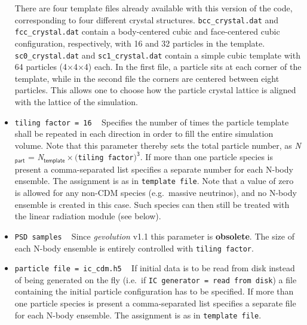 \documentclass[a4paper,10pt]{article}
\begin{document}
\begin{itemize}
 There are four template files already available with this version of the code, corresponding to four different crystal structures.
 \texttt{bcc\_crystal.dat} and \texttt{fcc\_crystal.dat} contain a body-centered cubic and face-centered cubic configuration, respectively,
 with 16 and 32 particles in the template. \texttt{sc0\_crystal.dat} and \texttt{sc1\_crystal.dat} contain a simple cubic template with 64
 particles (4$\times$4$\times$4) each. In the first file, a particle sits at each corner of the template, while in the second file the
 corners are centered between eight particles. This allows one to choose how the particle crystal lattice is aligned with the lattice of the
 simulation.
 \item[] \hspace{-25pt}\texttt{tiling factor = 16} ~ Specifies the number of times the particle template shall be repeated in each direction
 in order to fill the entire simulation volume. Note that this parameter thereby sets the total particle number, as
 \textit{N}$_\mathsf{part}$ = \textit{N}$_\mathsf{template} \times ($\texttt{tiling factor}$)^\mathsf{3}$. If more than one particle species
 is present a comma-separated list specifies a separate number for each N-body ensemble. The assignment is as in \texttt{template file}.
 Note that a value of zero is allowed for any non-CDM species (e.g.\ massive neutrinos), and no N-body ensemble is created in this case.
 Such species can then still be treated with the linear radiation module (see below).
 \item[] \hspace{-25pt}\texttt{PSD samples} ~ Since \textit{gevolution} v1.1 this parameter is \textbf{obsolete}. The size of each N-body
 ensemble is entirely controlled with \texttt{tiling factor}.
 \item[] \hspace{-25pt}\texttt{particle file = ic\_cdm.h5} ~ If initial data is to be read from disk instead of being generated on the fly (i.e.\ if \texttt{IC~generator~=~read~from~disk}) a file containing the initial particle configuration has to be specified. If more than
 one particle species is present a comma-separated list specifies a separate file for each N-body ensemble. The assignment is as in \texttt{template file}.
 

\end{itemize}
\end{document}
